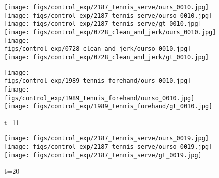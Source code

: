 \documentclass{article}
\begin{document}
\begin{appendix}
\begin{figure*}[!thbp]
    \centering
    \vspace{60pt}
	\begin{subfigure}{0.04\linewidth}
        \raggedleft
    \end{subfigure}
    \begin{subfigure}{0.12\linewidth}
        \caption*{t=11}
        \vspace{-7pt}
	    \texttt{[image: figs/control\_exp/2187\_tennis\_serve/ours\_0010.jpg]}
	    \texttt{[image: figs/control\_exp/2187\_tennis\_serve/ourso\_0010.jpg]}
	    \vspace{.2cm}
  		\texttt{[image: figs/control\_exp/2187\_tennis\_serve/gt\_0010.jpg]}
  		\texttt{[image: figs/control\_exp/0728\_clean\_and\_jerk/ours\_0010.jpg]}
  		\texttt{[image: figs/control\_exp/0728\_clean\_and\_jerk/ourso\_0010.jpg]}
  		\vspace{.2cm}
  		\texttt{[image: figs/control\_exp/0728\_clean\_and\_jerk/gt\_0010.jpg]}
  		\caption*{t=11}
  		\vspace{-7pt}
  		\texttt{[image: figs/control\_exp/1989\_tennis\_forehand/ours\_0010.jpg]}
  		\texttt{[image: figs/control\_exp/1989\_tennis\_forehand/ourso\_0010.jpg]}
  		\vspace{.2cm}
  		\texttt{[image: figs/control\_exp/1989\_tennis\_forehand/gt\_0010.jpg]}
	\end{subfigure} 
    \begin{subfigure}{0.12\linewidth}
        \caption*{t=20}
        \vspace{-7pt}
	    \texttt{[image: figs/control\_exp/2187\_tennis\_serve/ours\_0019.jpg]}
	    \texttt{[image: figs/control\_exp/2187\_tennis\_serve/ourso\_0019.jpg]}
	    \vspace{.2cm}
  		\texttt{[image: figs/control\_exp/2187\_tennis\_serve/gt\_0019.jpg]}

\end{subfigure}
\end{figure*}
\end{appendix}
\end{document}
